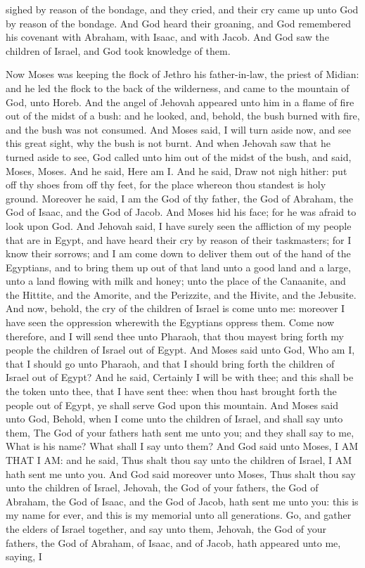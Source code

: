 sighed by reason of the bondage, and they cried, and their cry came up unto God by reason of the bondage. And God heard their groaning, and God remembered his covenant with Abraham, with Isaac, and with Jacob. And God saw the children of Israel, and God took knowledge of them. 

Now Moses was keeping the flock of Jethro his father-in-law, the priest of Midian: and he led the flock to the back of the wilderness, and came to the mountain of God, unto Horeb. And the angel of Jehovah appeared unto him in a flame of fire out of the midst of a bush: and he looked, and, behold, the bush burned with fire, and the bush was not consumed. And Moses said, I will turn aside now, and see this great sight, why the bush is not burnt. And when Jehovah saw that he turned aside to see, God called unto him out of the midst of the bush, and said, Moses, Moses. And he said, Here am I. And he said, Draw not nigh hither: put off thy shoes from off thy feet, for the place whereon thou standest is holy ground. Moreover he said, I am the God of thy father, the God of Abraham, the God of Isaac, and the God of Jacob. And Moses hid his face; for he was afraid to look upon God. And Jehovah said, I have surely seen the affliction of my people that are in Egypt, and have heard their cry by reason of their taskmasters; for I know their sorrows; and I am come down to deliver them out of the hand of the Egyptians, and to bring them up out of that land unto a good land and a large, unto a land flowing with milk and honey; unto the place of the Canaanite, and the Hittite, and the Amorite, and the Perizzite, and the Hivite, and the Jebusite. And now, behold, the cry of the children of Israel is come unto me: moreover I have seen the oppression wherewith the Egyptians oppress them. Come now therefore, and I will send thee unto Pharaoh, that thou mayest bring forth my people the children of Israel out of Egypt. And Moses said unto God, Who am I, that I should go unto Pharaoh, and that I should bring forth the children of Israel out of Egypt? And he said, Certainly I will be with thee; and this shall be the token unto thee, that I have sent thee: when thou hast brought forth the people out of Egypt, ye shall serve God upon this mountain.  And Moses said unto God, Behold, when I come unto the children of Israel, and shall say unto them, The God of your fathers hath sent me unto you; and they shall say to me, What is his name? What shall I say unto them? And God said unto Moses, I AM THAT I AM: and he said, Thus shalt thou say unto the children of Israel, I AM hath sent me unto you. And God said moreover unto Moses, Thus shalt thou say unto the children of Israel, Jehovah, the God of your fathers, the God of Abraham, the God of Isaac, and the God of Jacob, hath sent me unto you: this is my name for ever, and this is my memorial unto all generations. Go, and gather the elders of Israel together, and say unto them, Jehovah, the God of your fathers, the God of Abraham, of Isaac, and of Jacob, hath appeared unto me, saying, I 